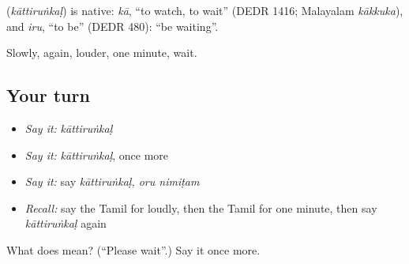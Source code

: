 \begin{cousinweb}
\textbf{} (\emph{kāttiruṅkaḷ}) is native: \emph{kā}, \textquotedblleft{}to watch, to wait\textquotedblright{} (DEDR 1416; Malayalam \emph{kākkuka}), and \emph{iru}, \textquotedblleft{}to be\textquotedblright{} (DEDR 480): \textquotedblleft{}be waiting\textquotedblright{}.
\end{cousinweb}

\begin{grammarlens}[title={What you've built}]
Slowly, again, louder, one minute, wait.
\end{grammarlens}

\subsection*{Your turn}
\begin{itemize}
\raggedright
  \item \emph{Say it:} \emph{kāttiruṅkaḷ}
  \item \emph{Say it:} \emph{kāttiruṅkaḷ}, once more
  \item \emph{Say it:} say \emph{kāttiruṅkaḷ, oru nimiṭam}
  \item \emph{Recall:} say the Tamil for loudly, then the Tamil for one minute, then say \emph{kāttiruṅkaḷ} again
\end{itemize}

\begin{tcolorbox}[breakable,colback=teal!4,colframe=teal!35!black,title={Before you move on}]
What does  mean? (\textquotedblleft{}Please wait\textquotedblright{}.) Say it once more.
\end{tcolorbox}
